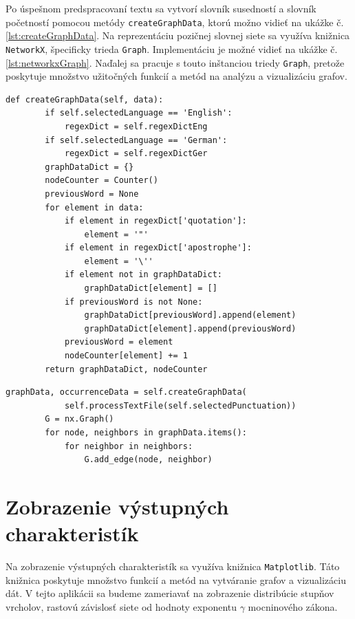 Po úspešnom predspracovaní textu sa vytvorí slovník susedností a slovník početností pomocou metódy \texttt{createGraphData}, ktorú
možno vidieť na ukážke č. \ref{lst:createGraphData}. Na reprezentáciu pozičnej slovnej siete sa využíva knižnica \texttt{NetworkX}, špecificky
trieda \texttt{Graph}. Implementáciu je možné vidieť na ukážke č. \ref{lst:networkxGraph}. Naďalej sa pracuje s touto inštanciou triedy \texttt{Graph},
pretože poskytuje množstvo užitočných funkcií a metód na analýzu a vizualizáciu grafov.

\clearpage

\begin{lstlisting}[caption={Metóda pre vytvorenie pozičnej slovnej siete z predspracovaného textu.}, label={lst:createGraphData}]
    def createGraphData(self, data):
        if self.selectedLanguage == 'English':
            regexDict = self.regexDictEng
        if self.selectedLanguage == 'German':
            regexDict = self.regexDictGer
        graphDataDict = {}
        nodeCounter = Counter()
        previousWord = None
        for element in data:
            if element in regexDict['quotation']:
                element = '"'
            if element in regexDict['apostrophe']:
                element = '\''
            if element not in graphDataDict:
                graphDataDict[element] = []
            if previousWord is not None:
                graphDataDict[previousWord].append(element)
                graphDataDict[element].append(previousWord)
            previousWord = element
            nodeCounter[element] += 1
        return graphDataDict, nodeCounter
\end{lstlisting}

\begin{lstlisting}[caption={Vytvorenie inštancie triedy NetworkX.Graph.}, label={lst:networkxGraph}]
    graphData, occurrenceData = self.createGraphData(
            self.processTextFile(self.selectedPunctuation))
        G = nx.Graph()
        for node, neighbors in graphData.items():
            for neighbor in neighbors:
                G.add_edge(node, neighbor)
\end{lstlisting}

\section{Zobrazenie výstupných charakteristík}\label{sec:graphicalOutput}

Na zobrazenie výstupných charakteristík sa využíva knižnica \texttt{Matplotlib}. Táto knižnica poskytuje množstvo funkcií
a metód na vytváranie grafov a vizualizáciu dát. V tejto aplikácii sa budeme zameriavať na zobrazenie distribúcie stupňov
vrcholov, rastovú závislosť siete od hodnoty exponentu $\gamma$ mocninového zákona.

